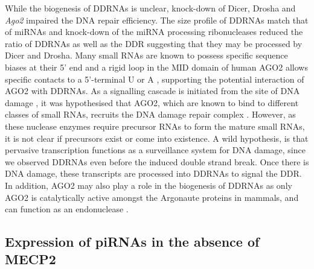 While the biogenesis of DDRNAs is unclear, knock-down of Dicer, Drosha \citep{francia2012site} and \textit{Ago2} \citep{pmid22445173} impaired the DNA repair efficiency. The size profile of DDRNAs match that of miRNAs and knock-down of the miRNA processing ribonucleases reduced the ratio of DDRNAs as well as the DDR \citep{francia2012site} suggesting that they may be processed by Dicer and Drosha. Many small RNAs are known to possess specific sequence biases at their 5' end and a rigid loop in the MID domain of human AGO2 allows specific contacts to a 5'-terminal U or A \citep{pmid23732335}, supporting the potential interaction of AGO2 with DDRNAs. As a signalling cascade is initiated from the site of DNA damage \citep{pmid19847258}, it was hypothesised that AGO2, which are known to bind to different classes of small RNAs, recruits the DNA damage repair complex \citep{pmid22445173}. However, as these nuclease enzymes require precursor RNAs to form the mature small RNAs, it is not clear if precursors exist or come into existence. A wild hypothesis, is that pervasive transcription functions as a surveillance system for DNA damage, since we observed DDRNAs even before the induced double strand break. Once there is DNA damage, these transcripts are processed into DDRNAs to signal the DDR. In addition, AGO2 may also play a role in the biogenesis of DDRNAs as only AGO2 is catalytically active amongst the Argonaute proteins in mammals, and can function as an endonuclease \citep{pmid23732335}.

\subsection{Expression of piRNAs in the absence of MECP2}

